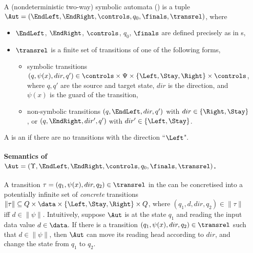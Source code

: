 \begin{definition}\label{def-2sa}
    A (nondeterministic two-way)  symbolic automata (\SSA) is a tuple $\Aut = (\EndLeft, \EndRight, \controls, q_0, \finals, \transrel)$, where  
\begin{itemize}
%
\item $\EndLeft$, $\EndRight$, $\controls$, $q_0$, $\finals$ are defined precisely as in \FFA{}s, 
%
\item $\transrel$ is a finite set of transitions of one of the following forms,
\begin{itemize}
\item     symbolic transitions $(q, \psi(x), dir, q') \in \controls \times \Psi \times \{\Left, \Stay, \Right\} \times \controls$, where $q, q'$ are the source and target state, $dir$ is the direction, and $\psi(x)$ is the guard of the transition, 
%
\item     non-symbolic transitions $(q, \EndLeft, dir, q')$ with $dir \in \{\Right, \Stay\}$, or $(q, \EndRight, dir', q')$ with $dir' \in \{\Left,\Stay\}$. 
\end{itemize}
\end{itemize}
A \SSA{} is an \SA{} if there are no transitions with the direction ``$\Left$". 
\end{definition}

\paragraph{Semantics of \SSA{} $\Aut = (\Upsilon, \EndLeft, \EndRight, \controls, q_0, \finals, \transrel)$.}
A transition $\tau=(q_1,\psi(x), dir, q_2) \in \transrel$ in the \SSA{}  can be concretised
into a potentially infinite set of \emph{concrete} transitions $\|\tau\| \subseteq Q \times \data \times \{\Left, \Stay, \Right\} \times Q$, where $(q_1, d, dir, q_2)  \in \|\tau\|$ iff $d \in \|\psi\|$.
Intuitively, suppose $\Aut$ is at the state $q_1$ and reading the input data value $d \in \data$.
If there is a transition $(q_1, \psi(x), dir, q_2) \in \transrel$ such that $d \in \|\psi\|$, then $\Aut$ can move its reading head according to $dir$, and change the state from $q_1$ to $q_2$.

